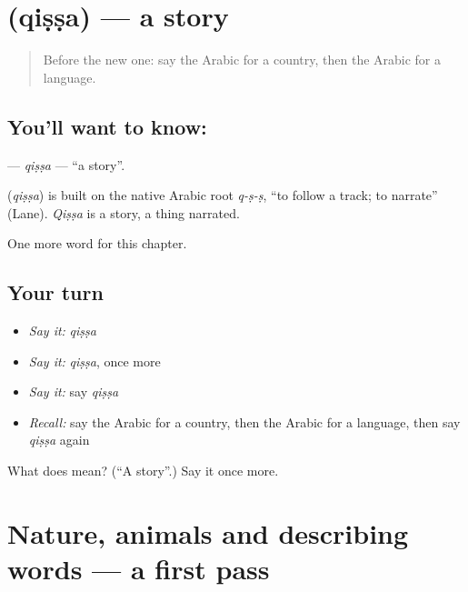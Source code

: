 \section[\texorpdfstring{\ar{قصة} (qiṣṣa)}{قصة (qiṣṣa)}]{ (qiṣṣa) — a story}

\label{lesson:AR-C99-qissa}



\begin{quote}
Before the new one: say the Arabic for a country, then the Arabic for a language.
\end{quote}

\subsection*{You'll want to know: }
\textbf{} — \emph{qiṣṣa} — \textquotedblleft{}a story\textquotedblright{}.

\begin{cousinweb}
\textbf{} (\emph{qiṣṣa}) is built on the native Arabic root \emph{q-ṣ-ṣ}, \textquotedblleft{}to follow a track; to narrate\textquotedblright{} (Lane). \emph{Qiṣṣa} is a story, a thing narrated.
\end{cousinweb}

\begin{grammarlens}[title={What you've built}]
One more word for this chapter.
\end{grammarlens}

\subsection*{Your turn}
\begin{itemize}
\raggedright
  \item \emph{Say it:} \emph{qiṣṣa}
  \item \emph{Say it:} \emph{qiṣṣa}, once more
  \item \emph{Say it:} say \emph{qiṣṣa}
  \item \emph{Recall:} say the Arabic for a country, then the Arabic for a language, then say \emph{qiṣṣa} again
\end{itemize}

\begin{tcolorbox}[breakable,colback=teal!4,colframe=teal!35!black,title={Before you move on}]
What does  mean? (\textquotedblleft{}A story\textquotedblright{}.) Say it once more.
\end{tcolorbox}
\section[(dialogue)]{Nature, animals and describing words — a first pass}

